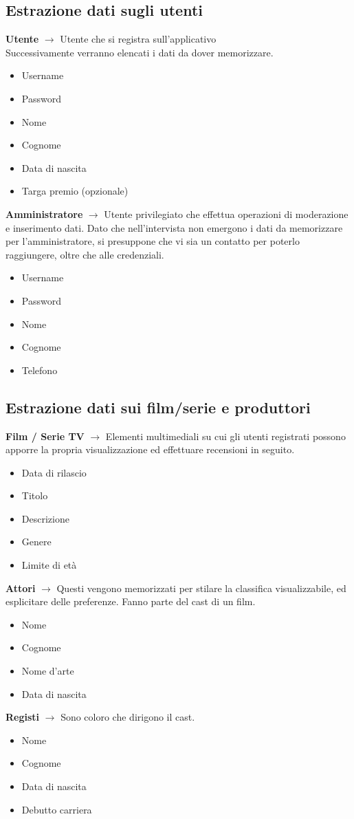 \documentclass[a4paper,12pt]{report}
\begin{document}
\subsection{Estrazione dati sugli utenti}
\textbf{Utente} $\longrightarrow$ Utente che si registra sull'applicativo\\Successivamente verranno elencati i dati da dover memorizzare.
\begin{itemize}
	\item Username
	\item Password
	\item Nome
	\item Cognome
	\item Data di nascita
	\item Targa premio (opzionale)
\end{itemize}
\textbf{Amministratore} $\longrightarrow$ Utente privilegiato che effettua operazioni di moderazione e inserimento dati. Dato che nell'intervista non emergono i dati da memorizzare per l'amministratore, si presuppone che vi sia un contatto per poterlo raggiungere, oltre che alle credenziali.
\begin{itemize}
	\item Username
	\item Password
	\item Nome
	\item Cognome
	\item Telefono
\end{itemize}
\subsection{Estrazione dati sui film/serie e produttori}
\textbf{Film / Serie TV} $\longrightarrow$ Elementi multimediali su cui gli utenti registrati possono apporre la propria visualizzazione ed effettuare recensioni in seguito.
\begin{itemize}
	\item Data di rilascio
	\item Titolo
	\item Descrizione
	\item Genere
	\item Limite di età
\end{itemize}
\textbf{Attori} $\longrightarrow$ Questi vengono memorizzati per stilare la classifica visualizzabile, ed esplicitare delle preferenze. Fanno parte del cast di un film.
\begin{itemize}
	\item Nome
	\item Cognome
	\item Nome d'arte
	\item Data di nascita
\end{itemize}
\textbf{Registi} $\longrightarrow$ Sono coloro che dirigono il cast.
\begin{itemize}
	\item Nome
	\item Cognome
	\item Data di nascita
	\item Debutto carriera
\end{itemize}
\end{document}
